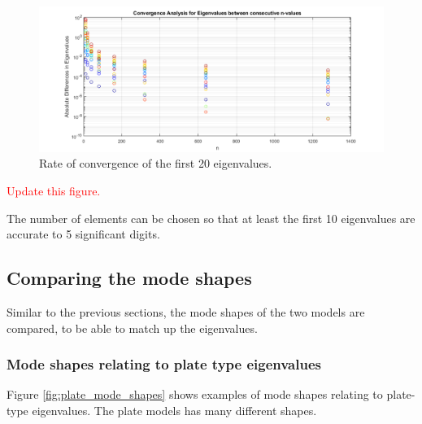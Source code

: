 \documentclass[../../main.tex]{subfiles}
\begin{document}
\begin{figure}[H]
    \centering
    \begin{adjustbox}{center}
        \includegraphics[scale=0.7]{Convergence.png}
    \end{adjustbox}
    \caption{Rate of convergence of the first 20 eigenvalues.}
    \label{fig:conv_3d_eig}
\end{figure}
\textcolor{red}{Update this figure.}

The number of elements can be chosen so that at least the first 10 eigenvalues are accurate to 5 significant digits.

\subsection{Comparing the mode shapes}
Similar to the previous sections, the mode shapes of the two models are compared, to be able to match up the eigenvalues.

\subsubsection{Mode shapes relating to plate type eigenvalues}
Figure \ref{fig:plate_mode_shapes} shows examples of mode shapes relating to plate-type eigenvalues. The plate models has many different shapes.
\end{document}
